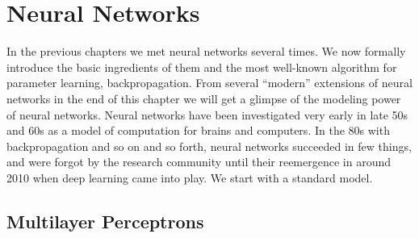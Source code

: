 \documentclass[../main.tex]{subfiles}
\begin{document}

\chapter{Neural Networks}
In the previous chapters we met neural networks several times. We now formally introduce the basic ingredients of them and the most well-known algorithm for parameter learning, backpropagation. From several ``modern'' extensions of neural networks in the end of this chapter we will get a glimpse of the modeling power of neural networks. Neural networks have been investigated very early in late 50s and 60s as a model of computation for brains and computers. In the 80s with backpropagation and so on and so forth, neural networks succeeded in few things, and were forgot by the research community until their reemergence in around 2010 when deep learning came into play. We start with a standard model.

\section{Multilayer Perceptrons}
\end{document}
